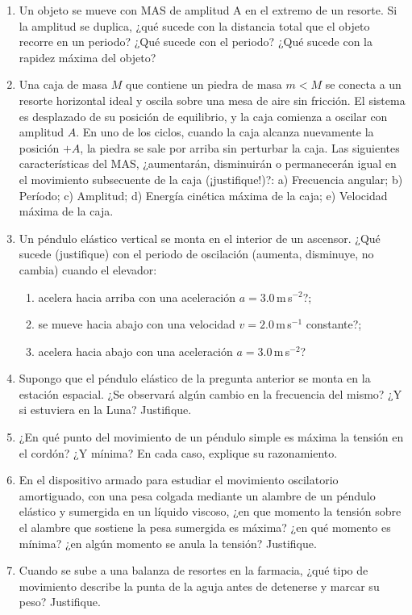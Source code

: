 \documentclass[a4paper,12pt]{article}
\begin{document}
\begin{enumerate}
	\item Un objeto se mueve con MAS de amplitud A en el extremo de un resorte.
		Si la amplitud se duplica, ¿qué sucede con la distancia total que el
		objeto recorre en un periodo? ¿Qué sucede con el periodo? ¿Qué sucede
		con la rapidez máxima del objeto?
	\item Una caja de masa $M$ que contiene un piedra de masa $m<M$ se conecta
		a un resorte horizontal ideal y oscila sobre una mesa de aire sin
		fricción. El sistema es desplazado de su posición de equilibrio, y la
		caja comienza a oscilar con amplitud $A$. En uno de los ciclos, cuando
		la caja alcanza nuevamente la posición $+A$, la piedra se sale por
		arriba sin perturbar la caja. Las siguientes características del MAS,
		¿aumentarán, disminuirán o permanecerán igual en el movimiento
		subsecuente de la caja (¡justifique!)?: a) Frecuencia
		angular; b) Período; c) Amplitud; d) Energía cinética máxima de la
		caja; e) Velocidad máxima  de la caja.
	\item Un péndulo elástico vertical se monta en el interior de un ascensor.
		¿Qué sucede (justifique) con el periodo de oscilación (aumenta,
		disminuye, no cambia) cuando el elevador:
		\begin{enumerate}
			\item acelera hacia arriba con una aceleración
				$a=3.0$\,m\,s$^{-2}$?; 
			\item se mueve hacia abajo con una velocidad $v=2.0$\,m\,s$^{-1}$
				constante?;
			\item acelera hacia abajo con una aceleración $a=3.0$\,m\,s$^{-2}$?
		\end{enumerate}
	\item Supongo que el péndulo elástico de la pregunta anterior se monta en
		la estación espacial. ¿Se observará algún cambio en la frecuencia del
		mismo? ¿Y si estuviera en la Luna? Justifique.
	\item ¿En qué punto del movimiento de un péndulo simple es máxima la
		tensión en el cordón? ¿Y mínima? En cada caso, explique su
		razonamiento.
	\item En el dispositivo armado para estudiar el movimiento oscilatorio
		amortiguado, con una pesa colgada mediante un alambre de un péndulo
		elástico y sumergida en un líquido viscoso, ¿en que momento la tensión
		sobre el alambre que sostiene la pesa sumergida es máxima? ¿en qué
		momento es mínima? ¿en algún momento se anula la tensión? Justifique.
	\item Cuando se sube a una balanza de resortes en la farmacia, ¿qué tipo de
		movimiento describe la punta de la aguja antes de detenerse y marcar su
		peso? Justifique.
\end{enumerate}
\end{document}
